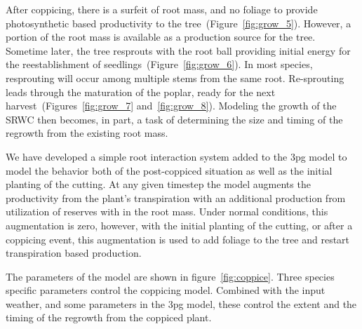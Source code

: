 \documentclass[10pt]{article}
\begin{document}
After coppicing, there is a surfeit of root mass, and no foliage to
provide photosynthetic based productivity to the
tree~(Figure~\ref{fig:grow_5}).  However, a portion of the root mass
is available as a production source for the tree.  Sometime later, the
tree resprouts with the root ball providing initial energy for the
reestablishment of seedlings~(Figure~\ref{fig:grow_6}). In most
species, resprouting will occur among multiple stems from the same
root.  Re-sprouting leads through the maturation of the poplar, ready for
the next harvest~(Figures~\ref{fig:grow_7} and~\ref{fig:grow_8}).
Modeling the growth of the \ac{SRWC} then becomes, in part, a task of
determining the size and timing of the regrowth from the existing root
mass.

We have developed a simple root interaction system added to the
\ac{3pg} model to model the behavior both of the post-coppiced
situation as well as the initial planting of the cutting. At any given
timestep the model augments the productivity from the plant's
transpiration with an additional production from utilization of
reserves with in the root mass.  Under normal conditions, this
augmentation is zero, however, with the initial planting of the
cutting, or after a coppicing event, this augmentation is used to add
foliage to the tree and restart transpiration based production.

The parameters of the model are shown in figure~\ref{fig:coppice}.
Three species specific parameters control the coppicing model.
Combined with the input weather, and some parameters in the \ac{3pg}
model, these control the extent and the timing of the regrowth from
the coppiced plant.
\end{document}
